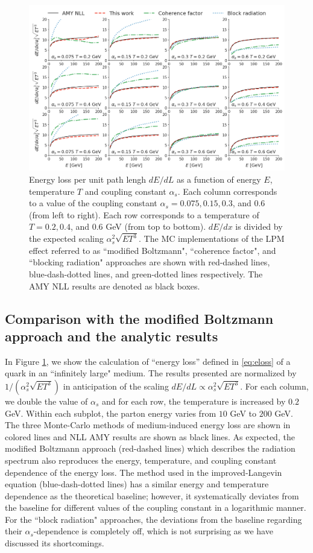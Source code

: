 \documentclass[aps, prc, reprint, amsmath, groupedaddress, nofootinbib]{revtex4-1}
\begin{document}
\begin{figure}
\centering
\includegraphics[width=1.\textwidth]{Eloss_infinite.pdf}
\caption{Energy loss per unit path lengh $dE/dL$ as a function of energy $E$, temperature $T$ and coupling constant $\alpha_s$. Each column corresponds to a value of the coupling constant $\alpha_s = 0.075, 0.15, 0.3$, and $0.6$ (from left to right). Each row corresponds to a temperature of $T = 0.2, 0.4$, and $0.6$ GeV (from top to bottom). $dE/dx$ is divided by the expected scaling $\alpha_s^2 \sqrt{ET^3}$. The MC implementations of the LPM effect referred to as ``modified Boltzmann", ``coherence factor", and ``blocking radiation" approaches are shown with red-dashed lines, blue-dash-dotted lines, and green-dotted lines respectively. The AMY NLL results are denoted as black boxes.}
\label{fig:eloss-inf}
\end{figure}


\subsection{Comparison with the modified Boltzmann approach and the analytic results}
In Figure \ref{fig:eloss-inf}, we show the calculation of ``energy loss'' defined in \ref{eq:eloss} of a quark in an ``infinitely large" medium. 
The results presented are normalized by $1/(\alpha_s^2 \sqrt{ET^3})$ in anticipation of the scaling $dE/dL \propto \alpha_s^2 \sqrt{ET^3}$.
For each column, we double the value of $\alpha_s$ and for each row, the temperature is increased by $0.2$ GeV. 
Within each subplot, the parton energy varies from $10$ GeV to $200$ GeV.
The three Monte-Carlo methods of medium-induced energy loss are shown in colored lines and NLL AMY results are shown as black lines.
As expected, the modified Boltzmann approach (red-dashed lines) which describes the radiation spectrum also reproduces the energy, temperature, and coupling constant dependence of the energy loss.
The method used in the improved-Langevin equation (blue-dash-dotted lines) has a similar energy and temperature dependence as the theoretical baseline; however, it systematically deviates from the baseline for different values of the coupling constant in a logarithmic manner.
For the ``block radiation" approaches, the deviations from the baseline regarding their $\alpha_s$-dependence is completely off, which is not surprising as we have discussed its shortcomings.
\end{document}
